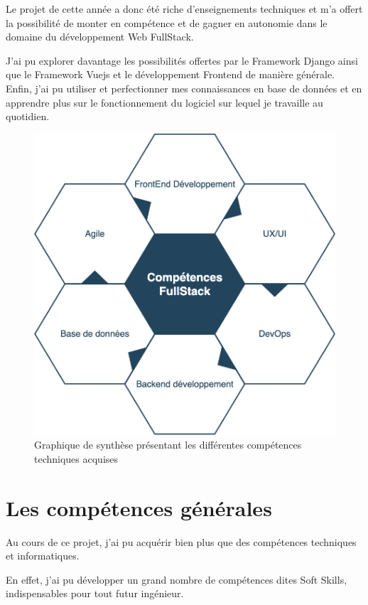 Le projet de cette année a donc été riche d’enseignements techniques et m’a offert la possibilité de monter en compétence et de gagner en autonomie dans le domaine du développement Web FullStack.

 J’ai pu explorer davantage les possibilités offertes par le Framework Django ainsi que le Framework Vuejs et le développement Frontend de manière générale. Enfin, j’ai pu utiliser et perfectionner mes connaissances en base de données et en apprendre plus sur le fonctionnement du logiciel sur lequel je travaille au quotidien.
 \begin{figure}[hp]
    \centering
    \includegraphics{images/skill_hard.png}
    \caption{Graphique de synthèse présentant les différentes compétences techniques acquises}
\end{figure}
\pagebreak

\section{Les compétences générales}
Au cours de ce projet, j’ai pu acquérir bien plus que des compétences techniques et informatiques. 

En effet, j’ai pu développer un grand nombre de compétences dites Soft Skills, indispensables pour tout futur ingénieur. 

